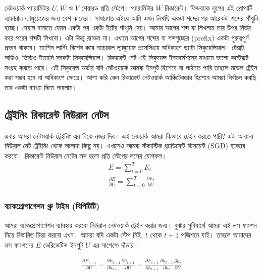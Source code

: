 নেটওয়ার্ক প্যারামিটার $U, W$ ও $V$ শেয়ারড প্রতি স্টেপে। প্যারামিটার $W$ রিকারেন্ট। ফিডব্যাক লুপের এই প্রোপার্টি ন্যাচারাল ল্যাঙ্গুয়েজের জন্য বেশ কাজের। 
সাধারণত এইযে আমি এখন লিখছি একটা শব্দের পর আরেকটা শব্দের গাঁথুনি হচ্ছে। দেয়াল বানাতে যেমন একটা পর একটা ইটের গাঁথুনি দেয়। 
আমার আগের শব্দ যা লিখলাম তার উপর নির্ভর করে পরের শব্দটী লিখবো। এটা কিন্তু র‍্যান্ডম না। এখানে আগের শব্দের বা শব্দগুচ্ছের (prefix)  একটা গুরুত্বপুর্ণ প্রভাব থাকবে। 
ম্যাশিন লার্নিং বিশেষ করে ন্যাচারাল ল্যাঙ্গুয়েজ প্রসেসিংয়ে  অধিকাংশ ড্যাটা সিকুয়েন্সিয়াল। টেক্সট, অডিও, ভিডিও ইত্যাদি সবকটা সিকুয়েন্সিয়াল।
রিকারেন্ট নেট এই সিকুয়েন্স ইনফর্মেশনের মাধ্যমে ভালো কন্টেক্সট সংগ্রহ করতে পারে। এই সিকুয়েন্স অর্ডার যদি নেটওয়ার্কে আমরা ইনপুট হিশেবে না পাঠাতে পারি তাহলে 
মডেল ট্রেইন করা সম্ভব হবে না অধিকাংশ ক্ষেত্রে। আশা করি কেন রিকারেন্ট নেটওয়ার্ক আর্কিটেকচার হিশেবে আমরা নির্বাচন করছি তার একটা ব্যাখ্যা দিতে পারলাম। 

\subsection{ট্রেইনিং রিকারেন্ট নিউরাল নেটস}
এবার আমরা নেটওয়ার্ক ট্রেইনিং এর দিকে নজর দিব। এই নেটয়ার্ক আমরা কিভাবে ট্রেইন করতে পারি? এটা অন্যান্য নিউরাল নেট ট্রেইনিং থেকে আলাদা কিছু নয়।
এখানেও আমরা স্টকাস্টিক গ্র্যাডিয়েন্ট ডিসচেন্ট  (SGD) ব্যবহার করবো। রিকারেন্ট নিউরাল নেটের লস হলো প্রতি স্টেপের লসের যোগফল। 
\begin{align} %
   E = \sum_{t=0} ^{T} E_t \\
   \frac {\partial E} {\partial U} = \sum _{t=0} ^{T} \frac {\partial E_t} { \partial U}
\end{align}



\subsubsection{ব্যাকপ্রোপাগেশন থ্রু টাইম (বিপিটিটি)}
আমরা ব্যাকপ্রোপাগেশন ব্যাবহার করবো নিউরাল নেটওয়ার্ক ট্রেইন করার জন্য। বুঝার সুবিধার্থে আমরা এই লস ফাংশন নিয়ে বিস্তারিত চিন্তা করবো এখন। আমরা যদি একটা স্টেপ নিই, $t$ থেকে $t+1$ পজিশনে যাই। তাহলে আমাদের লস ফাংশনের $E$ ডেরিভেটিভ ইনপুট $U$ এর সাপেক্ষে দাঁড়ায়। 

\begin{align} %
   \frac {\partial E_{t+1}} {\partial U} = \frac {\partial E_{t+1}} { \partial h_{t+1}} \frac {\partial h_{t+1}} { \partial U} = \frac {\partial E_{t+1}} { \partial h_{t+1}} \frac {\partial h_{t+1}} { \partial h_t} \frac {\partial h_t} { \partial U}\\
\end{align} 

